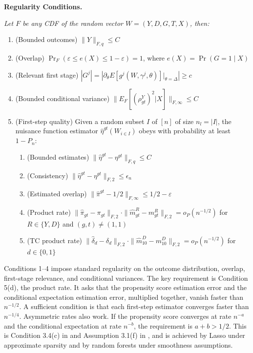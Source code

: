 \noindent
\textbf{Regularity Conditions.} {\itshape Let $F$ be any CDF of the random vector $W=(Y,D,G,T,X)$, then:
\begin{enumerate}
    \item[1.] (Bounded outcomes) \( \| Y \|_{F,q} \leq C \)
    \item[2.] (Overlap) \( \Pr_F(\varepsilon \leq e(X) \leq 1-\varepsilon) = 1 \), where $e(X) = \Pr(G=1 \mid X)$
    \item[3.] (Relevant first stage) \( |G^j| = |\partial_\theta E[g^j(W,\gamma^j,\theta)]\big|_{\theta=\Delta}| \geq c \)
    \item[4.] (Bounded conditional variance) \( \| E_F[(\rho^Y_{gt})^2|X] \|_{F,\infty} \leq C \)
    \item[5.] (First-step quality) Given a random subset \( I \) of \( [n] \) of size \( n_l = |I| \), the nuisance function estimator \( \hat{\eta}^{gt}(W_{i \in I}) \) obeys with probability at least \( 1-P_n \):
    \begin{enumerate}
        \item[(a)] (Bounded estimates) \( \| \hat{\eta}^{gt} - \eta^{gt} \|_{F,q} \leq C \)
        \item[(b)] (Consistency) \( \| \hat{\eta}^{gt} - \eta^{gt} \|_{F,2} \leq \epsilon_n \)
        \item[(c)] (Estimated overlap) \( \| \hat{\pi}^{gt} - 1/2 \|_{F,\infty} \leq 1/2 - \varepsilon \)
        \item[(d)] (Product rate) \( \| \hat{\pi}_{gt} - \pi_{gt} \|_{F,2} \cdot \| \hat{m}^{R}_{gt} - m^{R}_{gt} \|_{F,2} = o_P(n^{-1/2}) \) for $R\in\{Y,D\}$ and $(g,t)\neq(1,1)$
        \item[(d')] (TC product rate) \( \| \hat{\delta}_d - \delta_d \|_{F,2} \cdot \| \hat{m}^D_{10} - m^D_{10} \|_{F,2} = o_P(n^{-1/2}) \) for $d \in \{0,1\}$
    \end{enumerate}
\end{enumerate}

}
\medskip
Conditions 1--4 impose standard regularity on the outcome distribution, overlap, first-stage relevance, and conditional variances. The key requirement is Condition 5(d), the product rate. It asks that the propensity score estimation error and the conditional expectation estimation error, multiplied together, vanish faster than $n^{-1/2}$. A sufficient condition is that each first-step estimator converges faster than $n^{-1/4}$. Asymmetric rates also work. If the propensity score converges at rate $n^{-a}$ and the conditional expectation at rate $n^{-b}$, the requirement is $a + b > 1/2$. This is Condition 3.4(c) in \cite{DDML2018} and Assumption 3.1(f) in \cite{chang2020double}, and is achieved by Lasso under approximate sparsity and by random forests under smoothness assumptions.
\medskip

